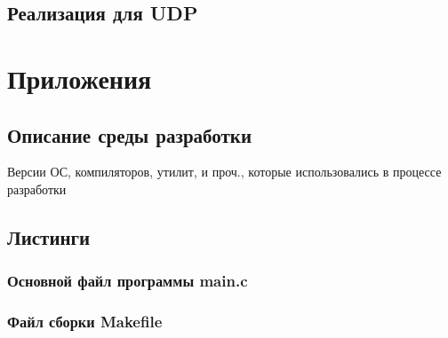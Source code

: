 \documentclass[12pt,a4paper]{report}
\begin{document}
\section{Реализация для UDP}

\chapter*{Приложения}
\section*{Описание среды разработки}
Версии ОС, компиляторов, утилит, и проч., которые использовались в процессе разработки
\section*{Листинги}
\subsection*{Основной файл программы main.c}
%
\subsection*{Файл сборки Makefile}
%
\end{document}

